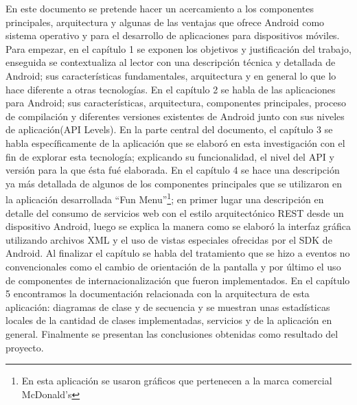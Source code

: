 \documentclass[letterpaper,12pt]{book}
\begin{document}
\begin{frontmatter}
En este documento se pretende  hacer un acercamiento a los componentes
principales, arquitectura y algunas de las ventajas que ofrece Android
como  sistema operativo  y  para el  desarrollo  de aplicaciones  para
dispositivos móviles.  Para  empezar, en el capítulo 1  se exponen los
objetivos y  justificación del trabajo, enseguida  se contextualiza al
lector  con  una  descripción  técnica  y detallada  de  Android;  sus
características  fundamentales, arquitectura  y en  general lo  que lo
hace diferente a  otras tecnologías. En el capítulo 2  se habla de las
aplicaciones   para   Android;   sus  características,   arquitectura,
componentes principales, proceso de compilación y diferentes versiones
existentes de Android junto con sus niveles de aplicación(API Levels).
En  la  parte   central  del  documento,  el  capítulo 3  se  habla
específicamente de la aplicación  que se elaboró en esta investigación
con el  fin de explorar esta tecnología;  explicando su funcionalidad,
el nivel del API y versión  para la que ésta fué elaborada. En el  capítulo  4  se hace  una
descripción ya más detallada de algunos de los componentes principales
que se utilizaron en la aplicación desarrollada “Fun Menu”\footnote{En esta aplicación se usaron gráficos que
pertenecen a la marca comercial McDonald's \textregistered};  en primer
lugar una descripción  en detalle del consumo de  servicios web con el
estilo  arquitectónico REST  desde  un dispositivo  Android, luego  se
explica  la manera  como  se elaboró  la  interfaz gráfica  utilizando
archivos XML  y el uso  de vistas especiales  ofrecidas por el  SDK de
Android. Al finalizar el capítulo se habla del tratamiento que se hizo
a  eventos no  convencionales  como  el cambio  de  orientación de  la
pantalla y  por último el  uso de componentes  de internacionalización
que   fueron  implementados.    En  el   capítulo  5   encontramos  la
documentación  relacionada  con la  arquitectura  de esta  aplicación:
diagramas  de clase  y de  secuencia y  se muestran  unas estadísticas
locales  de la  cantidad de  clases implementadas,  servicios y  de la
aplicación  en  general.   Finalmente  se presentan  las  conclusiones
obtenidas como resultado del proyecto.



\end{frontmatter}
\end{document}
